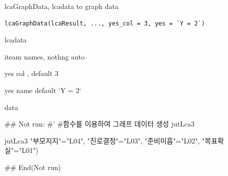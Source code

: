 \documentclass[a4paper]{book}
\begin{document}
%
\begin{Description}
lcaGraphData, lcadata to graph data
\end{Description}
%
\begin{Usage}
\begin{verbatim}
lcaGraphData(lcaResult, ..., yes_col = 3, yes = `Y = 2`)
\end{verbatim}
\end{Usage}
%
\begin{Arguments}
\begin{ldescription}
\item[\code{lcaResult}] lcadata

\item[\code{...}] iteam names, nothng auto

\item[\code{yes\_col}] yes col , default 3

\item[\code{yes}] yes name default `Y = 2`
\end{ldescription}
\end{Arguments}
%
\begin{Value}
data
\end{Value}
%
\begin{Examples}
\begin{ExampleCode}
\#\# Not run: 
#'
#함수를 이용하여 그래프 데이터 생성
jutLca3 %

jutLca3 %
                         "부모지지"="L04",
                         "진로결정"="L03",
                         "준비미흡"="L02",
                         "목표확실"="L01")


## End(Not run)

\end{ExampleCode}
\end{Examples}
\end{document}
